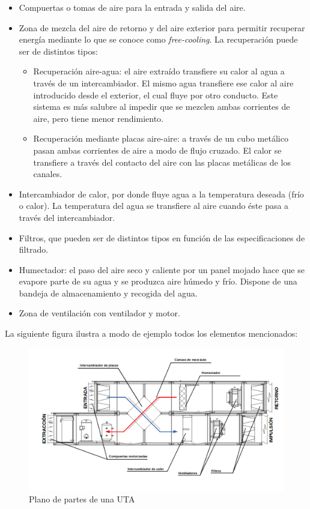 \begin{itemize}
    \item Compuertas o tomas de aire para la entrada y salida del aire.
    \item Zona de mezcla del aire de retorno y del aire exterior para permitir recuperar energía mediante lo que se conoce como \textit{free-cooling}. La recuperación puede ser de distintos tipos:
    \begin{itemize}
        \item Recuperación aire-agua: el aire extraído transfiere su calor al agua a través de un intercambiador. El mismo agua transfiere ese calor al aire introducido desde el exterior, el cual fluye por otro conducto. Este sistema es más salubre al impedir que se mezclen ambas corrientes de aire, pero tiene menor rendimiento.
        \item Recuperación mediante placas aire-aire: a través de un cubo metálico pasan ambas corrientes de aire a modo de flujo cruzado. El calor se transfiere a través del contacto del aire con las placas metálicas de los canales.
    \end{itemize}
    \item Intercambiador de calor, por donde fluye agua a la temperatura deseada (frío o calor). La temperatura del agua se transfiere al aire cuando éste pasa a través del intercambiador.
    \item Filtros, que pueden ser de distintos tipos en función de las especificaciones de filtrado.
    \item Humectador: el paso del aire seco y caliente por un panel mojado hace que se evapore parte de su agua y se produzca aire húmedo y frío. Dispone de una bandeja de almacenamiento y recogida del agua.
    \item Zona de ventilación con ventilador y motor.
\end{itemize}

La siguiente figura ilustra a modo de ejemplo todos los elementos mencionados:

\begin{figure}[H]
    \centering
    \includegraphics[width=\textwidth, keepaspectratio]{img/esquemaUTA}
    \caption{Plano de partes de una UTA}
    \label{figura:sasszxcsadsssd}
\end{figure}
